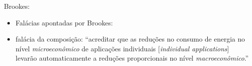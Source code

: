 Brookes:
\begin{itemize}
    \item Falácias apontadas por Brookes: 
    \item falácia da composição: ``acreditar que as reduções no consumo de energia no nível \textit{microeconômico} de aplicações individuais [\textit{individual applications}] levarão automaticamente a reduções proporcionais no nível \textit{macroeconômico}.'' \parencite[p. 321, grifo meu]{Brookes2000}

\end{itemize}
